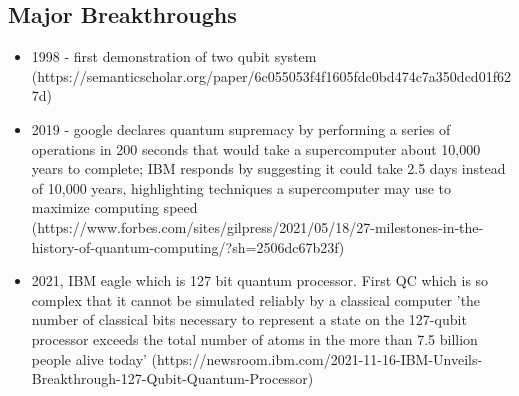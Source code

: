 \subsection{Major Breakthroughs}
\begin{itemize}
    \item 1998 - first demonstration of two qubit system (https://semanticscholar.org/paper/6c055053f4f1605fdc0bd474c7a350dcd01f627d)
    \item 2019 - google declares quantum supremacy by performing a series of operations in 200 seconds that would take a supercomputer about 10,000 years to complete; IBM responds by suggesting it could take 2.5 days instead of 10,000 years, highlighting techniques a supercomputer may use to maximize computing speed (https://www.forbes.com/sites/gilpress/2021/05/18/27-milestones-in-the-history-of-quantum-computing/?sh=2506dc67b23f)
    \item 2021, IBM eagle which is 127 bit quantum processor. First QC which is so complex that it cannot be simulated reliably by a classical computer 'the number of classical bits necessary to represent a state on the 127-qubit processor exceeds the total number of atoms in the more than 7.5 billion people alive today' (https://newsroom.ibm.com/2021-11-16-IBM-Unveils-Breakthrough-127-Qubit-Quantum-Processor)
\end{itemize}

